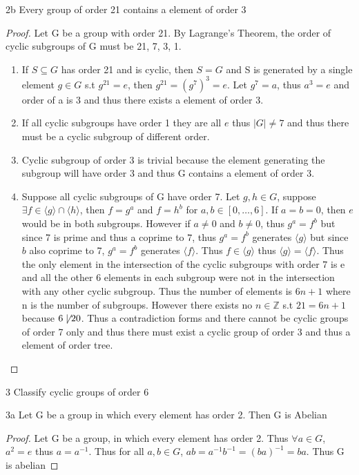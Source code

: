 \documentclass{article}
\newcommand{\Z}{\mathbb{Z}}
\begin{document}
\begin{claim}{2b}
    Every group of order 21 contains a element of order 3
\end{claim}
\begin{proof}
    Let G be a group with order 21. By Lagrange's Theorem, the order of cyclic subgroups of G must be 21, 7, 3, 1.

    \begin{enumerate}
        \item If $S \subseteq G$ has order 21 and is cyclic, then $S = G$ and S is generated by a single element $g \in G$ s.t $g^{21} = e$, then $g^21 = (g^7)^3 = e$. Let $g^7 = a$, thus $a^3 = e$ and order of a is 3 and thus there exists a element of order 3.
        \item If all cyclic subgroups have order 1 they are all $e$ thus $|G| \neq 7$ and thus there must be a cyclic subgroup of different order.
        \item Cyclic subgroup of order 3 is trivial because the element generating the subgroup will have order 3 and thus G contains a element of order 3.
        \item Suppose all cyclic subgroups of G have order 7. Let $g, h \in G$, suppose $\exists f \in \langle g \rangle \cap \langle h \rangle$, then $f = g^a$ and $f = h^b$ for $a, b \in [0, \ldots, 6]$. If $a = b = 0$, then $e$ would be in both subgroups. However if $a \neq 0$ and $b \neq 0$, thus $g^a = f^b$ but since 7 is prime and thus a coprime to $7$, thus $g^a = f^b$ generates $\langle g \rangle$ but since $b$ also coprime to 7, $g^a = f^b$ generates $\langle f \rangle$. Thus $f \in \langle g \rangle$ thus $\langle g \rangle = \langle f \rangle$. Thus the only element in the intersection of the cyclic subgroups with order 7 is e and all the other 6 elements in each subgroup were not in the intersection with any other cyclic subgroup. Thus the number of elements is $6n + 1$ where n is the number of subgroups. However there exists no $n \in \Z$ s.t $21 = 6n + 1$ because $6 \not \mid 20$. Thus a contradiction forms and there cannot be cyclic groups of order 7 only and thus there must exist a cyclic group of order 3 and thus a element of order tree.
    \end{enumerate}
\end{proof}

\begin{PROB}{3}\label{Problem 3.}
    Classify cyclic groups of order 6
\end{PROB}
\begin{claim}{3a}
    Let G be a group in which every element has order 2. Then G is Abelian
\end{claim}
\begin{proof}
    Let G be a group, in which every element has order 2. Thus $\forall a \in G$, $a^2 = e$ thus $a = a^{-1}$. Thus for all $a, b \in G$, $ab = a^{-1}b^{-1} = (ba)^{-1} = ba$. Thus G is abelian
\end{proof}
\end{document}
